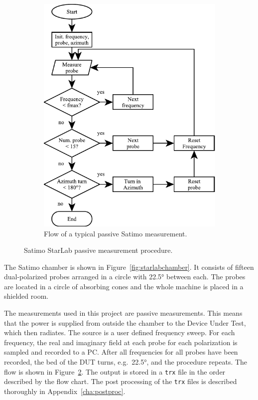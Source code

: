 \begin{figure}[htbp]
\begin{subfigure}[t]{0.49\linewidth}
        \includegraphics{img/analysis/satimoflow}
        \caption{Flow of a typical passive Satimo measurement.}
        \label{fig:satimoflow}
    \end{subfigure}
    \caption{Satimo StarLab passive measurement procedure.}
\end{figure}

The Satimo chamber is shown in Figure~\ref{fig:starlabchamber}. It consists of fifteen dual-polarized probes arranged in a circle with \ang{22.5} between each. The probes are located in a circle of absorbing cones and the whole machine is placed in a shielded room.

The measurements used in this project are passive measurements. This means that the power is supplied from outside the chamber to the Device Under Test, which then radiates. The source is a user defined frequency sweep. For each frequency, the real and imaginary field at each probe for each polarization is sampled and recorded to a PC. After all frequencies for all probes have been recorded, the bed of the DUT turns, e.g.\ \ang{22.5}, and the procedure repeats. The flow is shown in Figure~\ref{fig:satimoflow}. The output is stored in a \texttt{trx} file in the order described by the flow chart. The post processing of the \texttt{trx} files is described thoroughly in Appendix~\ref{cha:postproc}.

